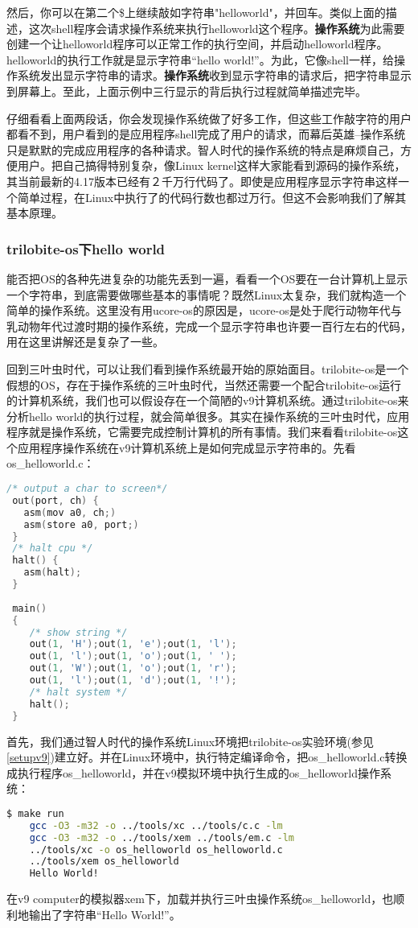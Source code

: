 然后，你可以在第二个\$上继续敲如字符串"helloworld"，并回车。类似上面的描述，这次shell程序会请求操作系统来执行helloworld这个程序。\textbf{操作系统}为此需要创建一个让helloworld程序可以正常工作的执行空间，并启动helloworld程序。helloworld的执行工作就是显示字符串“hello world!”。为此，它像shell一样，给操作系统发出显示字符串的请求。\textbf{操作系统}收到显示字符串的请求后，把字符串显示到屏幕上。至此，上面示例中三行显示的背后执行过程就简单描述完毕。

仔细看看上面两段话，你会发现操作系统做了好多工作，但这些工作敲字符的用户都看不到，用户看到的是应用程序shell完成了用户的请求，而幕后英雄--操作系统只是默默的完成应用程序的各种请求。智人时代的操作系统的特点是麻烦自己，方便用户。把自己搞得特别复杂，像Linux kernel这样大家能看到源码的操作系统，其当前最新的4.17版本已经有２千万行代码了。即使是应用程序显示字符串这样一个简单过程，在Linux中执行了的代码行数也都过万行。但这不会影响我们了解其基本原理。

\subsubsection{trilobite-os下hello world}
能否把OS的各种先进复杂的功能先丢到一遍，看看一个OS要在一台计算机上显示一个字符串，到底需要做哪些基本的事情呢？既然Linux太复杂，我们就构造一个简单的操作系统。这里没有用ucore-os的原因是，ucore-os是处于爬行动物年代与乳动物年代过渡时期的操作系统，完成一个显示字符串也许要一百行左右的代码，用在这里讲解还是复杂了一些。

回到三叶虫时代，可以让我们看到操作系统最开始的原始面目。trilobite-os是一个假想的OS，存在于操作系统的三叶虫时代，当然还需要一个配合trilobite-os运行的计算机系统，我们也可以假设存在一个简陋的v9计算机系统。通过trilobite-os来分析hello world的执行过程，就会简单很多。其实在操作系统的三叶虫时代，应用程序就是操作系统，它需要完成控制计算机的所有事情。我们来看看trilobite-os这个应用程序操作系统在v9计算机系统上是如何完成显示字符串的。先看os\_helloworld.c：
 
 \begin{lstlisting}[language={C}]
 /* output a char to screen*/
 out(port, ch) { 
   asm(mov a0, ch;)
   asm(store a0, port;) 
 }
 /* halt cpu */
 halt() { 
   asm(halt);
 }
 
 main()
 {
    /* show string */
 	out(1, 'H');out(1, 'e');out(1, 'l');
 	out(1, 'l');out(1, 'o');out(1, ' ');
 	out(1, 'W');out(1, 'o');out(1, 'r');
 	out(1, 'l');out(1, 'd');out(1, '!');
 	/* halt system */
 	halt();
 }
 \end{lstlisting}
 
首先，我们通过智人时代的操作系统Linux环境把trilobite-os实验环境(参见\ref{setupv9})建立好。并在Linux环境中，执行特定编译命令，把os\_helloworld.c转换成执行程序os\_helloworld，并在v9模拟环境中执行生成的os\_helloworld操作系统：
\begin{lstlisting}[language={bash}]
	$ make run
	gcc -O3 -m32 -o ../tools/xc ../tools/c.c -lm
	gcc -O3 -m32 -o ../tools/xem ../tools/em.c -lm
	../tools/xc -o os_helloworld os_helloworld.c
	../tools/xem os_helloworld
	Hello World!
\end{lstlisting}

在v9 computer的模拟器xem下，加载并执行三叶虫操作系统os\_helloworld，也顺利地输出了字符串“Hello World!”。